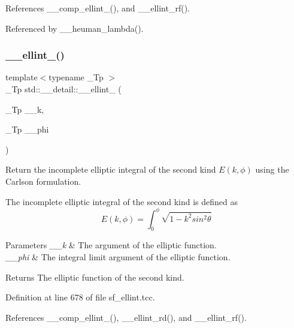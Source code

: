 References \+\_\+\+\_\+comp\+\_\+ellint\+\_(), and \+\_\+\+\_\+ellint\+\_\+rf().



Referenced by \+\_\+\+\_\+heuman\+\_\+lambda().

\mbox{\label{namespacestd_1_1____detail_ad3687a38e74e5fbf08265501add0b56a}} 
\subsubsection{\texorpdfstring{\+\_\+\+\_\+ellint\+\_()}{\_\_ellint\_2()}}
{\footnotesize\ttfamily template$<$typename \+\_\+\+Tp $>$ \\
\+\_\+\+Tp std\+::\+\_\+\+\_\+detail\+::\+\_\+\+\_\+ellint\+\_ (\begin{DoxyParamCaption}\item[{\+\_\+\+Tp}]{\+\_\+\+\_\+k,  }\item[{\+\_\+\+Tp}]{\+\_\+\+\_\+phi }\end{DoxyParamCaption})}



Return the incomplete elliptic integral of the second kind $ E(k,\phi) $ using the Carlson formulation. 

The incomplete elliptic integral of the second kind is defined as \[ E(k,\phi) = \int_0^{\phi} \sqrt{1 - k^2 sin^2\theta} \]


\begin{DoxyParams}{Parameters}
{\em \+\_\+\+\_\+k} & The argument of the elliptic function. \\
\hline
{\em \+\_\+\+\_\+phi} & The integral limit argument of the elliptic function. \\
\hline
\end{DoxyParams}
\begin{DoxyReturn}{Returns}
The elliptic function of the second kind. 
\end{DoxyReturn}


Definition at line 678 of file sf\+\_\+ellint.\+tcc.



References \+\_\+\+\_\+comp\+\_\+ellint\+\_(), \+\_\+\+\_\+ellint\+\_\+rd(), and \+\_\+\+\_\+ellint\+\_\+rf().

\mbox{\label{namespacestd_1_1____detail_a9c6ea96cd5d6907fce278010b992499a}} 
